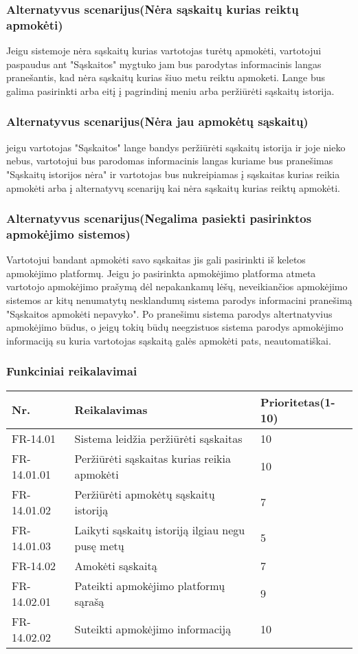 \documentclass[oneside]{VUMIFPSkursinis}
\begin{document}
	\subsubsection{Alternatyvus scenarijus(Nėra sąskaitų kurias reiktų apmokėti)}
	Jeigu sistemoje nėra sąskaitų kurias vartotojas turėtų apmokėti, vartotojui paspaudus ant "Sąskaitos" mygtuko jam bus parodytas informacinis langas pranešantis, kad nėra sąskaitų kurias šiuo metu reiktu apmoketi. Lange bus galima pasirinkti arba eitį į pagrindinį meniu arba peržiūrėti sąskaitų istorija.
	\subsubsection{Alternatyvus scenarijus(Nėra jau apmokėtų sąskaitų)}
	jeigu vartotojas "Sąskaitos" lange bandys peržiūrėti sąskaitų istorija ir joje nieko nebus, vartotojui bus parodomas informacinis langas kuriame bus pranešimas "Sąskaitų istorijos nėra" ir vartotojas bus nukreipiamas į sąskaitas kurias reikia apmokėti arba į alternatyvų scenarijų kai nėra sąskaitų kurias reiktų apmokėti.
	\subsubsection{Alternatyvus scenarijus(Negalima pasiekti pasirinktos apmokėjimo sistemos)}
	Vartotojui bandant apmokėti savo sąskaitas jis gali pasirinkti iš keletos apmokėjimo platformų. Jeigu jo pasirinkta apmokėjimo platforma atmeta vartotojo apmokėjimo prašymą dėl nepakankamų lėšų, neveikiančios apmokėjimo sistemos ar kitų nenumatytų nesklandumų sistema parodys informacini pranešimą "Sąskaitos apmokėti nepavyko". Po pranešimu sistema parodys altertnatyvius apmokėjimo būdus, o jeigų tokių būdų neegzistuos sistema parodys apmokėjimo informaciją su kuria vartotojas sąskaitą galės apmokėti pats, neautomatiškai.
	\subsubsection{Funkciniai reikalavimai}
\begin{table}[htbp]
	\begin{tabularx}{1\textwidth}{ |P{2.5cm}|X|P{3cm }| }  \hline
		Nr. & Reikalavimas & Prioritetas(1-10) \\ \hline
		FR-14.01 & Sistema leidžia peržiūrėti sąskaitas & 10 \\ \hline
		FR-14.01.01& Peržiūrėti sąskaitas kurias reikia apmokėti & 10 \\ \hline
		FR-14.01.02 & Peržiūrėti apmokėtų sąskaitų istoriją & 7 \\ \hline 
		FR-14.01.03 & Laikyti sąskaitų istoriją ilgiau negu pusę metų & 5 \\ \hline
		FR-14.02 & Amokėti sąskaitą & 7 \\ \hline
		FR-14.02.01 & Pateikti apmokėjimo platformų sąrašą & 9 \\ \hline
		FR-14.02.02 & Suteikti apmokėjimo informaciją & 10 \\ \hline
	\end{tabularx}
\end{table}
\end{document}
